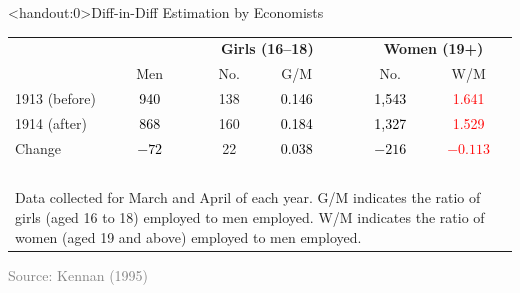 \documentclass[10pt,xcolor=table,ignorenonframetext,handout,aspectratio=169]{beamer}
\begin{document}

\begin{frame}<handout:0>{Diff-in-Diff Estimation by Economists}

\medskip
\begin{center}
	\begin{center}
		\begin{footnotesize}
			\begingroup
			\setlength{\tabcolsep}{2pt} %
			\renewcommand{\arraystretch}{1.6} %
			\begin{tabular}{lccccccc}
				\hline
				& & & \multicolumn{2}{c}{\textbf{Girls (16--18)}} & & \multicolumn{2}{c}{\textbf{Women (19+)}} \\ \cline{4-5} \cline{7-8}	
				& Men & & No. & G/M & & No. & W/M \\ \hline
				1913 (before)	& \textcolor{black}{940} & & 138 & \textcolor{black}{0.146} & & \textcolor{black}{1,543}	& \textcolor{red}{1.641} \\
				1914 (after) 	& \textcolor{black}{868} & & 160 & \textcolor{black}{0.184} & & \textcolor{black}{1,327} & \textcolor{red}{1.529} \\
				Change						& \textcolor{black}{$-72$}	& & 22  & \textcolor{black}{0.038} & & \textcolor{black}{$-216$} & \textcolor{red}{$-0.113$} \\ \hline 
				& & & \multicolumn{1}{p{1cm}}{$\ $} & \multicolumn{1}{p{1cm}}{$\ $} & & \multicolumn{1}{p{1cm}}{$\ $} & \multicolumn{1}{p{1cm}}{$\ $} \\ [-2.2em]
				\multicolumn{8}{p{7.2cm}}{\tiny{Data collected for March and April of each year.  G/M indicates the ratio of girls (aged 16 to 18) employed to men employed. W/M indicates the ratio of women (aged 19 and above) employed to men employed. }} \\
			\end{tabular}
			\endgroup
		\end{footnotesize}
	\end{center}
	
	\smallskip
	
	\textcolor{gray}{\tiny{Source:  Kennan (1995)}}
\end{center}

\end{frame}
\end{document}
